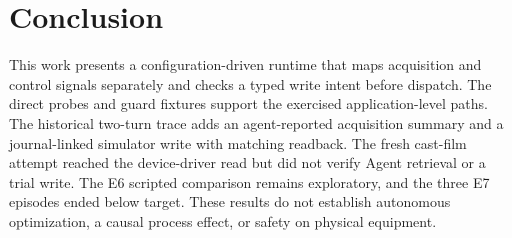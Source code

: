 \section{Conclusion}
\label{sec:conclusion}
This work presents a configuration-driven runtime that maps acquisition and control signals separately and checks a typed write intent before dispatch. The direct probes and guard fixtures support the exercised application-level paths. The historical two-turn trace adds an agent-reported acquisition summary and a journal-linked simulator write with matching readback. The fresh cast-film attempt reached the device-driver read but did not verify Agent retrieval or a trial write. The E6 scripted comparison remains exploratory, and the three E7 episodes ended below target. These results do not establish autonomous optimization, a causal process effect, or safety on physical equipment.
